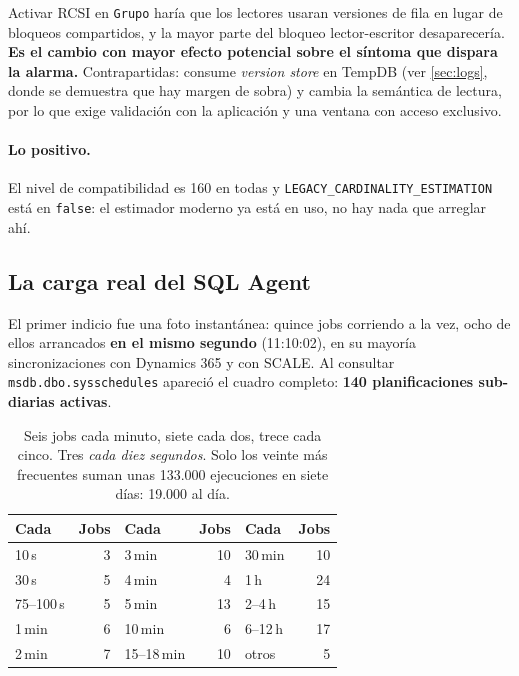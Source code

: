 \documentclass[11pt,a4paper]{article}
\newcommand{\cod}[1]{\texttt{\small #1}}
\newcommand{\critico}[1]{\textcolor{rojo}{\textbf{#1}}}
\begin{document}
Activar RCSI en \cod{Grupo} haría que los lectores usaran versiones de fila
en lugar de bloqueos compartidos, y la mayor parte del bloqueo
lector-escritor desaparecería. \textbf{Es el cambio con mayor efecto
potencial sobre el síntoma que dispara la alarma.} Contrapartidas: consume
\emph{version store} en TempDB (ver \ref{sec:logs}, donde se demuestra que
hay margen de sobra) y cambia la semántica de lectura, por lo que exige
validación con la aplicación y una ventana con acceso exclusivo.

\paragraph{Lo positivo.} El nivel de compatibilidad es 160 en todas y
\cod{LEGACY\_CARDINALITY\_ESTIMATION} está en \cod{false}: el estimador
moderno ya está en uso, no hay nada que arreglar ahí.

\subsection{La carga real del SQL Agent}

El primer indicio fue una foto instantánea: quince jobs corriendo a la vez,
ocho de ellos arrancados \textbf{en el mismo segundo} (11:10:02), en su
mayoría sincronizaciones con Dynamics 365 y con SCALE. Al consultar
\cod{msdb.dbo.sysschedules} apareció el cuadro completo:
\critico{140 planificaciones sub-diarias activas}.

\begin{table}[h]
\centering
\small
\begin{tabular}{lrlrlr}
\toprule
\textbf{Cada} & \textbf{Jobs} & \textbf{Cada} & \textbf{Jobs} &
\textbf{Cada} & \textbf{Jobs} \\
\midrule
10\,s  & 3 & 3\,min  & 10 & 30\,min & 10 \\
30\,s  & 5 & 4\,min  & 4  & 1\,h    & 24 \\
75--100\,s & 5 & 5\,min & 13 & 2--4\,h & 15 \\
1\,min & 6 & 10\,min & 6  & 6--12\,h & 17 \\
2\,min & 7 & 15--18\,min & 10 & otros & 5 \\
\bottomrule
\end{tabular}
\caption{Seis jobs cada minuto, siete cada dos, trece cada cinco. Tres
\emph{cada diez segundos}. Solo los veinte más frecuentes suman unas 133.000
ejecuciones en siete días: 19.000 al día.}
\end{table}
\end{document}
